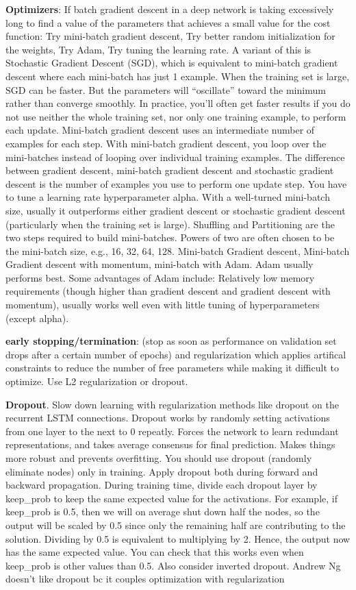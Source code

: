 \documentclass[]{book}
\begin{document}
\textbf{Optimizers}: If batch gradient descent in a deep network is
taking excessively long to find a value of the parameters that achieves
a small value for the cost function: Try mini-batch gradient descent,
Try better random initialization for the weights, Try Adam, Try tuning
the learning rate. A variant of this is Stochastic Gradient Descent
(SGD), which is equivalent to mini-batch gradient descent where each
mini-batch has just 1 example. When the training set is large, SGD can
be faster. But the parameters will ``oscillate'' toward the minimum
rather than converge smoothly. In practice, you'll often get faster
results if you do not use neither the whole training set, nor only one
training example, to perform each update. Mini-batch gradient descent
uses an intermediate number of examples for each step. With mini-batch
gradient descent, you loop over the mini-batches instead of looping over
individual training examples. The difference between gradient descent,
mini-batch gradient descent and stochastic gradient descent is the
number of examples you use to perform one update step. You have to tune
a learning rate hyperparameter alpha. With a well-turned mini-batch
size, usually it outperforms either gradient descent or stochastic
gradient descent (particularly when the training set is large).
Shuffling and Partitioning are the two steps required to build
mini-batches. Powers of two are often chosen to be the mini-batch size,
e.g., 16, 32, 64, 128. Mini-batch Gradient descent, Mini-batch Gradient
descent with momentum, mini-batch with Adam. Adam usually performs best.
Some advantages of Adam include: Relatively low memory requirements
(though higher than gradient descent and gradient descent with
momentum), usually works well even with little tuning of hyperparameters
(except alpha).

\textbf{early stopping/termination}: (stop as soon as performance on
validation set drops after a certain number of epochs) and
regularization which applies artifical constraints to reduce the number
of free parameters while making it difficult to optimize. Use L2
regularization or dropout.

\textbf{Dropout}. Slow down learning with regularization methods like
dropout on the recurrent LSTM connections. Dropout works by randomly
setting activations from one layer to the next to 0 repeatly. Forces the
network to learn redundant representations, and takes average consensus
for final prediction. Makes things more robust and prevents overfitting.
You should use dropout (randomly eliminate nodes) only in training.
Apply dropout both during forward and backward propagation. During
training time, divide each dropout layer by keep\_prob to keep the same
expected value for the activations. For example, if keep\_prob is 0.5,
then we will on average shut down half the nodes, so the output will be
scaled by 0.5 since only the remaining half are contributing to the
solution. Dividing by 0.5 is equivalent to multiplying by 2. Hence, the
output now has the same expected value. You can check that this works
even when keep\_prob is other values than 0.5. Also consider inverted
dropout. Andrew Ng doesn't like dropout bc it couples optimization with
regularization
\end{document}
